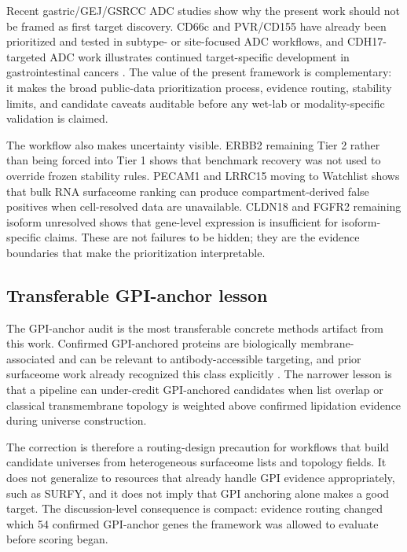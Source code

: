 \documentclass[review,12pt,authoryear]{elsarticle}
\begin{document}
Recent gastric/\allowbreak{}GEJ/\allowbreak{}GSRCC ADC studies show why the present work should not be framed as first target discovery. CD66c and PVR/\allowbreak{}CD155 have already been prioritized and tested in subtype- or site-focused ADC workflows, and CDH17-targeted ADC work illustrates continued target-specific development in gastrointestinal cancers \citep{zhang2025cd66c,zhao2026pvr,wang2025cdh17_adc}. The value of the present framework is complementary: it makes the broad public-data prioritization process, evidence routing, stability limits, and candidate caveats auditable before any wet-lab or modality-specific validation is claimed.

The workflow also makes uncertainty visible. ERBB2 remaining Tier 2 rather than being forced into Tier 1 shows that benchmark recovery was not used to override frozen stability rules. PECAM1 and LRRC15 moving to Watchlist shows that bulk RNA surfaceome ranking can produce compartment-derived false positives when cell-resolved data are unavailable. CLDN18 and FGFR2 remaining isoform unresolved shows that gene-level expression is insufficient for isoform-specific claims. These are not failures to be hidden;\allowbreak{} they are the evidence boundaries that make the prioritization interpretable.

\subsection{Transferable GPI-anchor lesson}

The GPI-anchor audit is the most transferable concrete methods artifact from this work. Confirmed GPI-anchored proteins are biologically membrane-associated and can be relevant to antibody-accessible targeting, and prior surfaceome work already recognized this class explicitly \citep{bauschfluck2018surfy}. The narrower lesson is that a pipeline can under-credit GPI-anchored candidates when list overlap or classical transmembrane topology is weighted above confirmed lipidation evidence during universe construction.

The correction is therefore a routing-design precaution for workflows that build candidate universes from heterogeneous surfaceome lists and topology fields. It does not generalize to resources that already handle GPI evidence appropriately, such as SURFY, and it does not imply that GPI anchoring alone makes a good target. The discussion-level consequence is compact: evidence routing changed which 54 confirmed GPI-anchor genes the framework was allowed to evaluate before scoring began.
\end{document}
